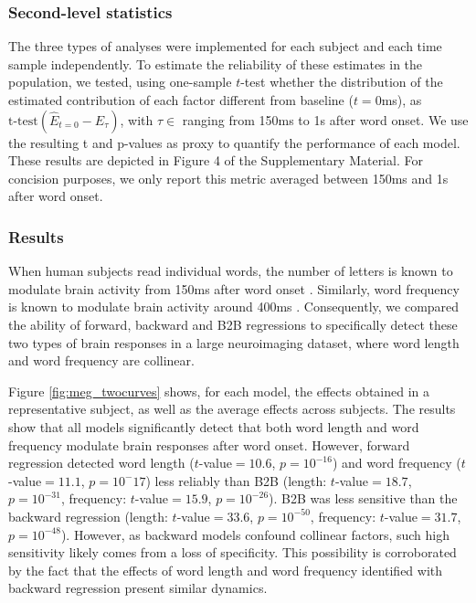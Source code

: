 \subsubsection{Second-level statistics}

The three types of analyses were implemented for each subject and each time
sample independently. To estimate the reliability of these estimates in the
population, we tested, using one-sample $t$-test whether the distribution of
the estimated contribution of each factor different from baseline ($t=0$ms),
as $\text{t-test}(\hat E_{t=0} - \hat E_{\tau})$, with $\tau \in $ ranging from
150ms to 1s after word onset. We use the resulting t and p-values as proxy to
quantify the performance of each model. These results are depicted in Figure
4 of the Supplementary Material. For concision purposes, we only report this metric averaged
between 150ms and 1s after word onset.

\subsubsection{Results}
When human subjects read individual words, the number of letters is known to modulate
brain activity from 150ms after word onset \citep{pegado2014timing}.
Similarly, word frequency is known to modulate brain activity around 400ms
\citep{kutas2011thirty}. Consequently, we compared the ability of forward, backward and B2B regressions to specifically detect these two types of brain responses in a large neuroimaging dataset, where word length and word frequency are collinear.

Figure \ref{fig:meg_twocurves} shows, for each model, the effects obtained
in a representative subject, as well as the average effects across subjects.
The results show that all models significantly detect that both word length and
word frequency modulate brain responses after word onset. However,
forward regression detected word length ($t$-value$=10.6$, $p=10^{-16}$) and
word frequency ($t$-value$=11.1$, $p=10^-17$) less reliably than B2B (length:
$t$-value$=18.7$, $p=10^{-31}$, frequency: $t$-value$=15.9$, $p=10^{-26}$). B2B
was less sensitive than the backward regression (length: $t$-value$=33.6$,
$p=10^{-50}$, frequency: $t$-value$=31.7$, $p=10^{-48}$). However, as backward models confound collinear factors, such high sensitivity likely comes from a loss of specificity. This possibility is corroborated by the fact that the effects of word length and word frequency identified with backward regression present similar dynamics.

